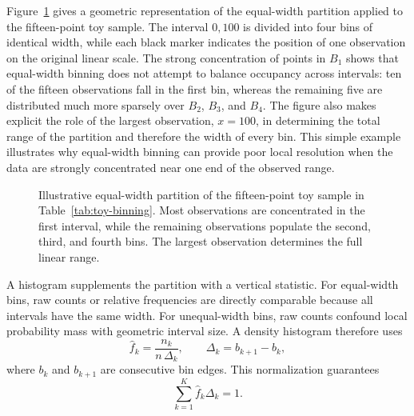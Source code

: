 \documentclass[12pt]{article}
\numberwithin{equation}{section}
\begin{document}
Figure~\ref{fig:toy-binning} gives a geometric representation of the equal-width partition applied to the fifteen-point toy sample. The interval $0,100$ is divided into four bins of identical width, while each black marker indicates the position of one observation on the original linear scale. The strong concentration of points in $B_1$ shows that equal-width binning does not attempt to balance occupancy across intervals: ten of the fifteen observations fall in the first bin, whereas the remaining five are distributed much more sparsely over $B_2$, $B_3$, and $B_4$. The figure also makes explicit the role of the largest observation, $x=100$, in determining the total range of the partition and therefore the width of every bin. This simple example illustrates why equal-width binning can provide poor local resolution when the data are strongly concentrated near one end of the observed range.


\begin{figure}[!htbp]
\centering
{}

\caption{Illustrative equal-width partition of the fifteen-point toy sample in Table~\ref{tab:toy-binning}. Most observations are concentrated in the first interval, while the remaining observations populate the second, third, and fourth bins. The largest observation determines the full linear range.}
\label{fig:toy-binning}
\end{figure}

A histogram supplements the partition with a vertical statistic. For equal-width bins, raw counts or relative frequencies are directly comparable because all intervals have the same width. For unequal-width bins, raw counts confound local probability mass with geometric interval size. A density histogram therefore uses
\begin{equation}
 \widehat f_k=\frac{n_k}{n\,\Delta_k},
 \qquad
 \Delta_k=b_{k+1}-b_k,
\label{eq:density-hist}
\end{equation}
where $b_k$ and $b_{k+1}$ are consecutive bin edges. This normalization guarantees
\begin{equation}
 \sum_{k=1}^{K}\widehat f_k\Delta_k=1.
\end{equation}
\end{document}
